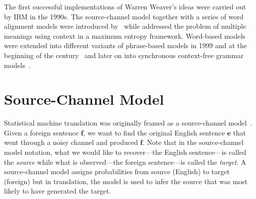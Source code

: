 The first successful implementations of Warren Weaver's ideas
were carried out by IBM in the 1990s. The source-channel
model together with a series of word alignment models were introduced
by~\citet{brown-dellapietra-dellapietra-mercer-1993} while
\citet{berger-dellapietra-dellapietra:1996:CL} addressed the problem
of multiple meanings using context in a maximum entropy framework.
Word-based models were extended into different variants
of phrase-based models in 1999 and at the
beginning of the
century~\citep{och-tillmann-ney:1999:EMNLP,koehn-och-marcu:2003:NAACL,och-ney:2004:CL}
and later on into synchronous context-free grammar
models~\citep{chiang:2005:ACL,chiang:2007:CL}.

\section{Source-Channel Model}
\label{sec:sourceChannelModel}




Statistical machine translation was originally framed as a source-channel
model~\citep{shannon:1948:BellSystemTechnicalJournal,brown-cocke-dellapietra-dellapietra-jelinek-lafferty-mercer-roossin:1990:CL,brown-dellapietra-dellapietra-mercer-1993}.
Given a
foreign sentence $\bm{f}$, we want to find the original English sentence
$\bm{e}$ that went through a noisy channel and produced $\bm{f}$. Note that in
the source-channel model notation, what we would like to
recover---the English sentence---is
called the \emph{source} while what is observed---the foreign sentence---is
called the \emph{target}. A source-channel model assigns probabilities
from source (English) to target (foreign) but in translation, the model
is used to infer the source that was most likely to have generated
the target.

